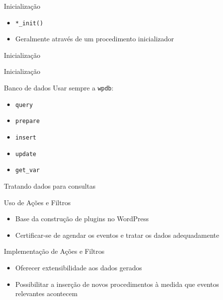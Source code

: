 \documentclass{beamer}
\begin{document}
\begin{frame}{Inicialização}
\begin{itemize}
  \pause \item \texttt{*\_init()}
  \pause \item Geralmente através de um procedimento inicializador
\end{itemize}
\end{frame}

\begin{frame}{Inicialização}
  
  \pause 
\end{frame}

\begin{frame}{Inicialização}
  
  \pause 
\end{frame}

\begin{frame}{Banco de dados}
Usar sempre a \texttt{wpdb}:
\begin{itemize}
  \pause \item \texttt{query}
  \pause \item \texttt{prepare}
  \pause \item \texttt{insert}
  \pause \item \texttt{update}
  \pause \item \texttt{get\_var}
\end{itemize}
\end{frame}

\begin{frame}{Tratando dados para consultas}
  \pause 
\end{frame}

\begin{frame}{Uso de Ações e Filtros}
\begin{itemize}
  \pause \item Base da construção de plugins no WordPress
  \pause \item Certificar-se de agendar os eventos e
    tratar os dados adequadamente
\end{itemize}
\end{frame}

\begin{frame}{Implementação de Ações e Filtros}
\begin{itemize}
  \pause \item Oferecer extensibilidade aos dados gerados
  \pause \item Possibilitar a inserção de novos procedimentos à medida
    que eventos relevantes acontecem
\end{itemize}
\end{frame}
\end{document}
